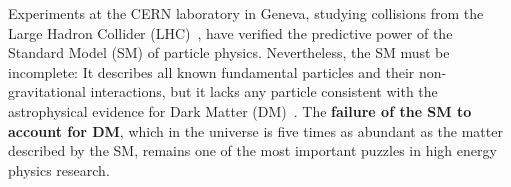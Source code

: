 Experiments at the CERN laboratory in Geneva, studying collisions from the Large Hadron Collider (LHC)~\cite{LHC2008}, have verified the predictive power of the Standard Model (SM) of particle physics. %
Nevertheless, the SM must be incomplete:
It describes all known fundamental particles and their non-gravitational interactions,
but it lacks any particle consistent with the astrophysical evidence for Dark Matter (DM)~\cite{Bertone:2016nfn}.
The \textbf{failure of the SM to account for DM}, which in the universe is five times as abundant as the matter described by the SM, remains one of the most important puzzles in high energy physics research.


